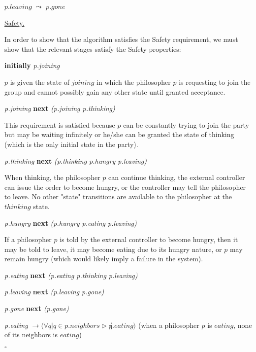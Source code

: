 \documentclass[11pt]{article}
\newenvironment{solution}{\noindent{\bf Solution.} }{

\hfill$\square$}
\begin{document}
\begin{solution}
\begin{enumerate}
$p.leaving$ $\leadsto$ $p.gone$

\indent

\end{enumerate}

\begin{enumerate}
\underline{\large{Safety.}}

In order to show that the algorithm satisfies the Safety requirement, we must show that the relevant stages satisfy the Safety properties:

{\bfseries initially} {\it p.joining}

\indent $p$ is given the state of $joining$ in which the philosopher $p$ is requesting to join the group and cannot possibly gain any other state until granted acceptance.

{\it p.joining} {\bfseries next} {\it (p.joining \vee p.thinking)}

\indent This requirement is satisfied because $p$ can be constantly trying to join the party but may be waiting infinitely or he/she can be granted the state of thinking (which is the only initial state in the party).

{\it p.thinking} {\bfseries next} {\it (p.thinking \vee p.hungry \vee p.leaving)}

\indent When thinking, the philosopher $p$ can continue thinking, the external controller can issue the order to become hungry, or the controller may tell the philosopher to leave. No other "state" transitions are available to the philosopher at the $thinking$ state. 

{\it p.hungry} {\bfseries next} {\it (p.hungry \vee p.eating \vee p.leaving)}

\indent If a philosopher $p$ is told by the external controller to become hungry, then it may be told to leave, it may become eating due to its hungry nature, or $p$ may remain hungry (which would likely imply a failure in the system).

{\it p.eating} {\bfseries next} {\it (p.eating \vee p.thinking \vee p.leaving)}

\indent

{\it p.leaving} {\bfseries next} {\it (p.leaving \vee p.gone)}

\indent

{\it p.gone} {\bfseries next} {\it (p.gone)}

\indent

{\it p.eating} $\rightarrow \langle \forall q | q \in p.neighbors \rhd \not q.eating \rangle$
(when a philosopher $p$ is $eating$, none of its neighbors is $eating$)


\end{enumerate}
\end{solution}
\end{document}
